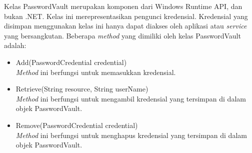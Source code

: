 Kelas PasswordVault merupakan komponen dari Windows Runtime API, dan bukan .NET\cite{WinAPI:2016}. Kelas ini merepresentasikan pengunci kredensial. Kredensial yang disimpan menggunakan kelas ini hanya dapat diakses oleh aplikasi atau \textit{service} yang bersangkutan. Beberapa \textit{method} yang dimiliki oleh kelas PasswordVault adalah:

\begin{itemize}
    \item{Add(PasswordCredential credential)\\\textit{Method} ini berfungsi untuk memasukkan kredensial.}
    \item{Retrieve(String resource, String userName)\\\textit{Method} ini berfungsi untuk mengambil kredensial yang tersimpan di dalam objek PasswordVault.}
    \item{Remove(PasswordCredential credential)\\\textit{Method} ini berfungsi untuk menghapus kredensial yang tersimpan di dalam objek PasswordVault.}
\end{itemize}


